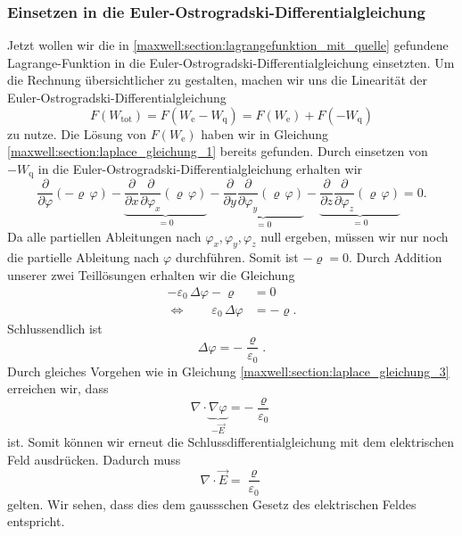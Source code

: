 \subsubsection{Einsetzen in die Euler-Ostrogradski-Differentialgleichung}
Jetzt wollen wir die in \eqref{maxwell:section:lagrangefunktion_mit_quelle} gefundene Lagrange-Funktion in die Euler-Ostrogradski-Differentialgleichung einsetzten.
Um die Rechnung übersichtlicher zu gestalten, machen wir uns die Linearität der Euler-Ostrogradski-Differentialgleichung
\begin{equation}
F(W_{\text{tot}})
=
F(W_{\text{e}} - W_{\text{q}})
=
F(W_{\text{e}}) + F(-W_{\text{q}})
\label{maxwell:section:linearität_von_DGL}
\end{equation}
zu nutze.
Die Lösung von $F(W_{\text{e}})$ haben wir in Gleichung \eqref{maxwell:section:laplace_gleichung_1} bereits gefunden.
Durch einsetzen von $-W_{\text{q}}$ in die Euler-Ostrogradski-Differentialgleichung erhalten wir
\[
\frac{\partial}{\partial\varphi}\left(-\varrho\,\varphi\right) - \underbrace{\frac{\partial}{\partial x}\frac{\partial}{\partial\varphi_x}\left(\varrho\,\varphi\right)}_{=0} - \underbrace{\frac{\partial}{\partial y}\frac{\partial}{\partial\varphi_y}\left(\varrho\,\varphi\right)}_{=0} - \underbrace{\frac{\partial}{\partial z}\frac{\partial}{\partial\varphi_z}\left(\varrho\,\varphi\right)}_{=0}
=
0.
\]
Da alle partiellen Ableitungen nach $\varphi_x, \varphi_y, \varphi_z$ null ergeben, müssen wir nur noch die partielle Ableitung nach $\varphi$ durchführen.
Somit ist
\(
-\varrho
=
0.
\)
Durch Addition unserer zwei Teillösungen erhalten wir die Gleichung
\begin{align*}
-\varepsilon_0\,\Delta\varphi - \varrho
&=
0
\\
\Leftrightarrow \qquad \varepsilon_0\,\Delta\varphi
&=
-\varrho.
\end{align*}
Schlussendlich ist
\begin{equation}
\Delta\varphi
=
-\frac{\varrho}{\varepsilon_0}.
\label{maxwell:section:erste_maxwellgleichung_1}
\end{equation}
Durch gleiches Vorgehen wie in Gleichung \eqref{maxwell:section:laplace_gleichung_3} erreichen wir, dass
\[
\nabla\cdot\underbrace{\nabla\varphi}_{\displaystyle-\vec{E}}
=
-\frac{\varrho}{\varepsilon_0}
\]
ist.
Somit können wir erneut die Schlussdifferentialgleichung mit dem elektrischen Feld ausdrücken.
Dadurch muss
\begin{equation}
\nabla\cdot\vec{E}
=
\frac{\varrho}{\varepsilon_0}
\label{maxwell:section:erste_maxwellgleichung_2}
\end{equation}
gelten.
Wir sehen, dass dies dem gaussschen Gesetz des elektrischen Feldes entspricht.

